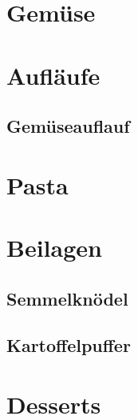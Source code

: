 \documentclass[ngerman,11pt,parskip=half,a5paper,twoside]{scrbook}
\begin{document}
\chapter{Gemüse}

\clearpage

\chapter{Aufläufe}


\clearpage

	\section{Gemüseauflauf} 
	 
	\clearpage
	
\chapter{Pasta}

\clearpage

\chapter{Beilagen}

\clearpage

	\section{Semmelknödel} 
	 
	\clearpage

	\section{Kartoffelpuffer} 
	 
	\clearpage
	
\chapter{Desserts}
\end{document}
